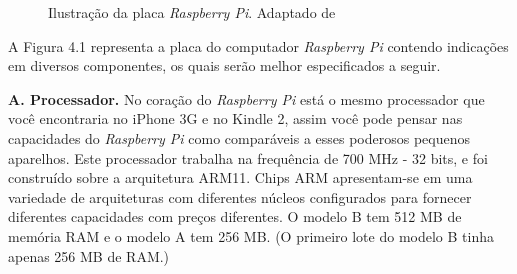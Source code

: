 \begin{figure}[ht]
    \centering
    \caption{Ilustração da placa \textit{Raspberry Pi}. Adaptado de \cite{RICHARDSON}}
\end{figure}

A Figura 4.1 representa a placa do computador \textit{Raspberry Pi} contendo indicações em diversos componentes, os quais serão melhor especificados a seguir.

\textbf{A. Processador.} No coração do \textit{Raspberry Pi} está o mesmo processador que você encontraria no iPhone 3G e no Kindle 2, assim você pode pensar nas capacidades do \textit{Raspberry Pi} como comparáveis a esses poderosos pequenos aparelhos. Este processador trabalha na frequência de 700 MHz - 32 bits, e foi construído sobre a arquitetura ARM11. Chips ARM apresentam-se em uma variedade de arquiteturas com diferentes núcleos configurados para fornecer diferentes capacidades com preços diferentes. O modelo B tem 512 MB de memória RAM e o modelo A tem 256 MB. (O primeiro lote do modelo B tinha apenas 256 MB de RAM.)
    
